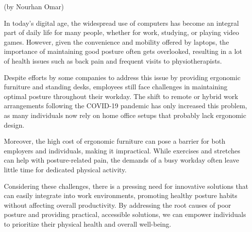 (by Nourhan Omar)

\p
In today's digital age, the widespread use of computers has become an integral part of daily life for many people, whether for work, studying, or playing video games. However, given the convenience and mobility offered by laptops, the importance of maintaining good posture often gets overlooked, resulting in a lot of health issues such as back pain and frequent visits to physiotherapists.

\p
Despite efforts by some companies to address this issue by providing ergonomic furniture and standing desks, employees still face challenges in maintaining optimal posture throughout their workday. The shift to remote or hybrid work arrangements following the COVID-19 pandemic has only increased this problem, as many individuals now rely on home office setups that probably lack ergonomic design.

\p
Moreover, the high cost of ergonomic furniture can pose a barrier for both employers and individuals, making it impractical. While exercises and stretches can help with posture-related pain, the demands of a busy workday often leave little time for dedicated physical activity.

\p
Considering these challenges, there is a pressing need for innovative solutions that can easily integrate into work environments, promoting healthy posture habits without affecting overall productivity. By addressing the root causes of poor posture and providing practical, accessible solutions, we can empower individuals to prioritize their physical health and overall well-being.